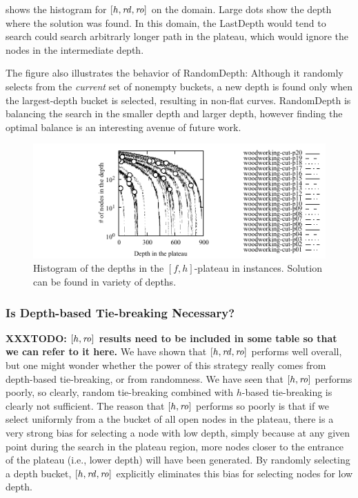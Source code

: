  shows the histogram 
for 
 $[h,\mbox{\textit{rd}},\mbox{\textit{ro}}]$ %
on the  domain.
Large dots show the depth where the solution was found.
In this domain, the LastDepth would tend to search could search arbitrarly longer path in the
plateau, which would ignore the nodes in the intermediate depth.

The figure also illustrates the behavior of RandomDepth: Although it
randomly selects from the \emph{current} set of nonempty buckets,
a new depth is found only when the largest-depth bucket is selected,
resulting in non-flat curves.
RandomDepth is balancing the search in the smaller depth and larger
depth, however finding the optimal balance is an interesting avenue of
future work.

\begin{figure}[tb]
 \centering {}
 \includegraphics{tables/aaai16-log-rd/2zerocost/depth-histogram-lmcut_rdlog1-woodworking-cut.pdf}
 \caption{Histogram of the depths in the $[f,h]$-plateau in
 instances. Solution can be found in variety of depths.
 }
 \label{depth-histogram}
\end{figure}


\subsubsection{Is Depth-based Tie-breaking Necessary?}

{\bf XXXTODO: $[h,\mbox{\textit{ro}}]$ results need to be included in some table so that we can refer to it here.}
We have shown that $[h,\mbox{\textit{rd}},\mbox{\textit{ro}}]$ performs well overall, but
one might wonder whether the power of this strategy really comes from depth-based tie-breaking, or from randomness.
We have seen that $[h,\mbox{\textit{ro}}]$ performs poorly, so clearly, random tie-breaking combined with $h$-based tie-breaking is clearly not sufficient.
The reason that $[h,\mbox{\textit{ro}}]$ performs so poorly is that if we select uniformly from a the bucket of all open nodes in the plateau, there is a very strong bias for selecting a node with low depth, simply because at any given point during the search in the plateau region, more nodes closer to the entrance of the plateau (i.e., lower depth) will have been generated.
By randomly selecting a depth bucket, $[h,\mbox{\textit{rd}},\mbox{\textit{ro}}]$ explicitly eliminates this bias for selecting nodes for low depth.

